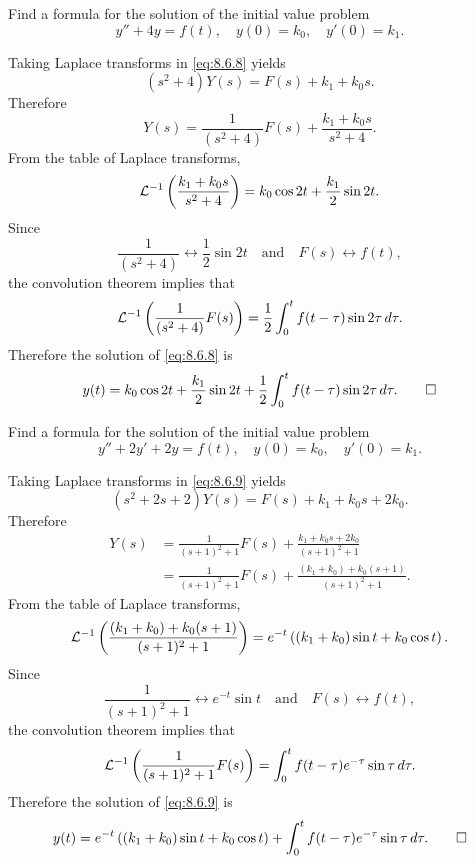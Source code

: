 \begin{example}\label{example:8.6.3}
 Find a formula for the solution of the initial value problem
\begin{equation}\label{eq:8.6.8}
y''+4y=f(t),\quad y(0)=k_0,\quad y'(0)=k_1.
\end{equation}
\end{example}

\begin{solution}
Taking Laplace transforms in \eqref{eq:8.6.8} yields
\[
(s^2+4)Y(s) =F(s)+k_1+k_0s.
\]
Therefore
\[
Y(s) =\frac{1}{(s^2+4)}F(s)+\frac{k_1+k_0s}{s^2+4}.
\]
From the table of Laplace transforms,
\[
{\mathcal L}^{-1}\left(\frac{k_1+k_0s}{s^2+4}\right)=k_0\cos 2t+\frac{k_1}{2}\sin 2t.
\]
Since
\[
\frac{1}{(s^2+4)}\leftrightarrow \frac{1}{2}\sin 2t\quad\text{and}\quad 
F(s)\leftrightarrow f(t),
\]
the convolution theorem implies that
\[
{\mathcal L}^{-1}\left(\frac{1}{(s^2+4)}F(s)\right)=
 \frac{1}{2}\int_0^t  f(t-\tau)\sin 2\tau\,
d\tau.
\]
Therefore the solution of  \eqref{eq:8.6.8} is
\[
y(t)=k_0\cos 2t+\frac{k_1}{2}\sin 2t+\frac{1}{2}\int_0^tf(t-\tau)\sin
2\tau\,d\tau.\qedhere
\]
\end{solution}

\begin{example}\label{example:8.6.4}
  Find a formula for the solution of the initial value problem
\begin{equation}\label{eq:8.6.9}
y''+2y'+2y=f(t),\quad y(0)=k_0,\quad y'(0)=k_1.
\end{equation}
\end{example}

\begin{solution}
Taking Laplace transforms in \eqref{eq:8.6.9} yields
\[
(s^2+2s+2)Y(s)=F(s)+k_1+k_0s+2k_0.
\]
Therefore
\begin{align*}
Y(s)&=\frac{1}{(s+1)^2+1}F(s)+\frac{k_1+k_0s+2k_0}{(s+1)^2+1}\\
&=\frac{1}{(s+1)^2+1}F(s)+\frac{(k_1+k_0)+k_0(s+1)}{(s+1)^2+1}.
\end{align*}
From the table of Laplace transforms,
\[
{\mathcal L}^{-1}\left(\frac{(k_1+k_0)+k_0(s+1)}{(s+1)^2+1}\right)=
e^{-t}\left((k_1+k_0)\sin t+k_0\cos t\right).
\]
Since
\[
\frac{1}{(s+1)^2+1}\leftrightarrow e^{-t}\sin t\quad\text{and}\quad 
 F(s)\leftrightarrow f(t),
\]
the convolution theorem implies that
\[
{\mathcal L}^{-1}\left(\frac{1}{(s+1)^2+1}F(s)\right)=
\int_0^t  f(t-\tau)e^{-\tau}\sin\tau
\,d\tau.
\]
Therefore the solution of  \eqref{eq:8.6.9} is
\begin{equation}\label{eq:8.6.10}
y(t)=e^{-t}\left((k_1+k_0)\sin t+k_0\cos
t\right)+\int_0^tf(t-\tau)e^{-\tau}\sin\tau\,d\tau.\qedhere
\end{equation}
\end{solution}


